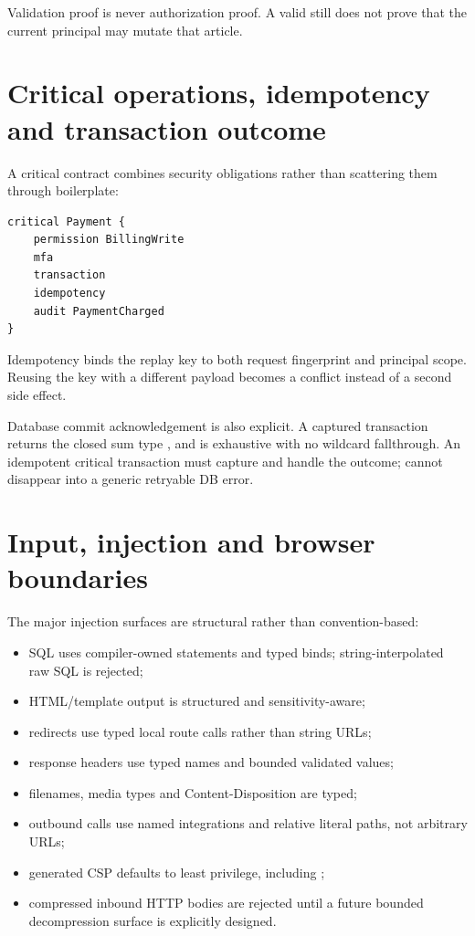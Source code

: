 Validation proof is never authorization proof. A valid  still does not prove that the current principal may mutate that article.

\section{Critical operations, idempotency and transaction outcome}

A critical contract combines security obligations rather than scattering them through boilerplate:

\begin{lstlisting}[language=Velran]
critical Payment {
    permission BillingWrite
    mfa
    transaction
    idempotency
    audit PaymentCharged
}
\end{lstlisting}

Idempotency binds the replay key to both request fingerprint and principal scope. Reusing the key with a different payload becomes a conflict instead of a second side effect.

Database commit acknowledgement is also explicit. A captured transaction returns the closed sum type , and  is exhaustive with no wildcard fallthrough. An idempotent critical transaction must capture and handle the outcome;  cannot disappear into a generic retryable DB error.

\section{Input, injection and browser boundaries}

The major injection surfaces are structural rather than convention-based:

\begin{itemize}
  \item SQL uses compiler-owned statements and typed binds; string-interpolated raw SQL is rejected;
  \item HTML/template output is structured and sensitivity-aware;
  \item redirects use typed local route calls rather than string URLs;
  \item response headers use typed names and bounded validated values;
  \item filenames, media types and Content-Disposition are typed;
  \item outbound calls use named integrations and relative literal paths, not arbitrary URLs;
  \item generated CSP defaults to least privilege, including ;
  \item compressed inbound HTTP bodies are rejected until a future bounded decompression surface is explicitly designed.
\end{itemize}

